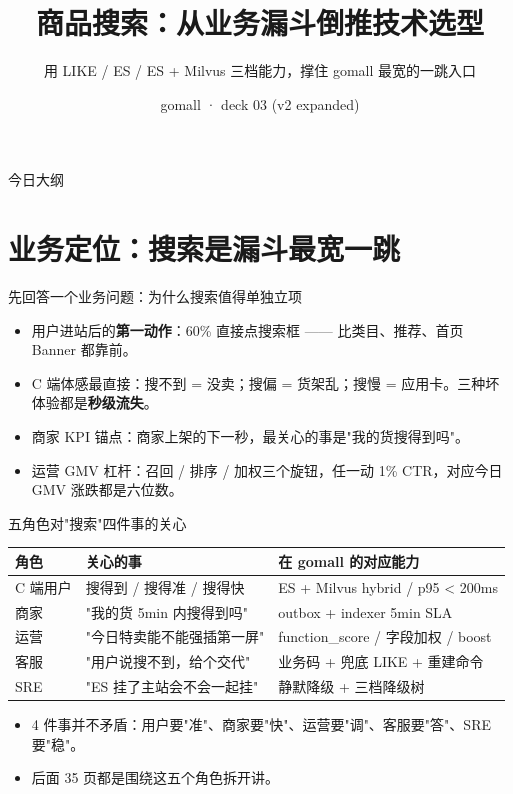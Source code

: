 \documentclass[aspectratio=169,11pt]{beamer}
\title{商品搜索：从业务漏斗倒推技术选型}
\subtitle{用 LIKE / ES / ES + Milvus 三档能力，撑住 gomall 最宽的一跳入口}
\author{gomall · deck 03 (v2 expanded)}
\date{}
\begin{document}
\maketitle

\begin{frame}[shrink]{今日大纲}
\tableofcontents
\end{frame}

\section{业务定位：搜索是漏斗最宽一跳}

\begin{frame}[shrink]{先回答一个业务问题：为什么搜索值得单独立项}
\begin{itemize}
  \item 用户进站后的\textbf{第一动作}：60\% 直接点搜索框 —— 比类目、推荐、首页 Banner 都靠前。
  \item C 端体感最直接：搜不到 = 没卖；搜偏 = 货架乱；搜慢 = 应用卡。三种坏体验都是\textbf{秒级流失}。
  \item 商家 KPI 锚点：商家上架的下一秒，最关心的事是"我的货搜得到吗"。
  \item 运营 GMV 杠杆：召回 / 排序 / 加权三个旋钮，任一动 1\% CTR，对应今日 GMV 涨跌都是六位数。
\end{itemize}
\end{frame}

\begin{frame}[shrink]{五角色对"搜索"四件事的关心}
\begin{tabular}{@{}lll@{}}
\toprule
角色      & 关心的事                                       & 在 gomall 的对应能力                  \\
\midrule
C 端用户   & 搜得到 / 搜得准 / 搜得快                       & ES + Milvus hybrid / p95 < 200ms     \\
商家      & "我的货 5min 内搜得到吗"                       & outbox + indexer 5min SLA            \\
运营      & "今日特卖能不能强插第一屏"                     & function\_score / 字段加权 / boost   \\
客服      & "用户说搜不到，给个交代"                       & 业务码 + 兜底 LIKE + 重建命令         \\
SRE      & "ES 挂了主站会不会一起挂"                      & 静默降级 + 三档降级树                \\
\bottomrule
\end{tabular}
\vspace{2mm}
\begin{itemize}
  \item 4 件事并不矛盾：用户要"准"、商家要"快"、运营要"调"、客服要"答"、SRE 要"稳"。
  \item 后面 35 页都是围绕这五个角色拆开讲。
\end{itemize}
\end{frame}
\end{document}
